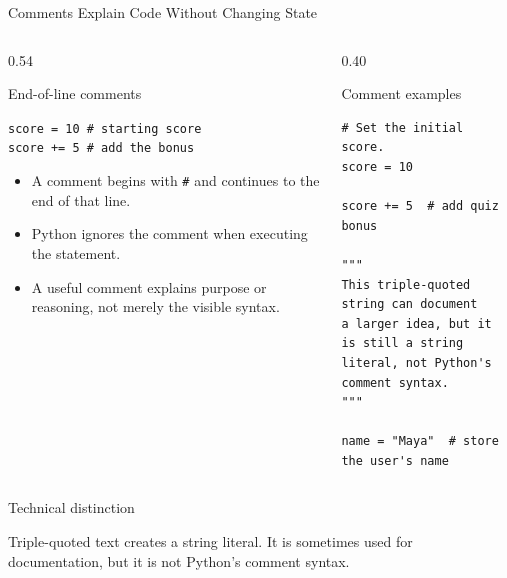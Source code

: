 \documentclass[aspectratio=169,10pt]{beamer}
\begin{document}
\begin{frame}[fragile]{Comments Explain Code Without Changing State}

  \begin{columns}[T,onlytextwidth]

    \begin{column}{0.54\textwidth}

      \begin{block}{End-of-line comments}

        \texttt{score = 10 \# starting score}\\
        \texttt{score += 5 \# add the bonus}

      \end{block}

      \begin{itemize}

        \item A comment begins with \texttt{\#} and continues to the end of that line.

        \item Python ignores the comment when executing the statement.

        \item A useful comment explains purpose or reasoning, not merely the visible syntax.

      \end{itemize}

    \end{column}

    \begin{column}{0.40\textwidth}

      \begin{block}{Comment examples}
      \scriptsize
\begin{verbatim}
# Set the initial score.
score = 10

score += 5  # add quiz bonus

"""
This triple-quoted string can document
a larger idea, but it is still a string
literal, not Python's comment syntax.
"""

name = "Maya"  # store the user's name
\end{verbatim}
      \end{block}

    \end{column}

  \end{columns}

  \begin{alertblock}{Technical distinction}

    Triple-quoted text creates a string literal. It is sometimes used for documentation, but it is not Python's comment syntax.

  \end{alertblock}


\end{frame}
\end{document}
